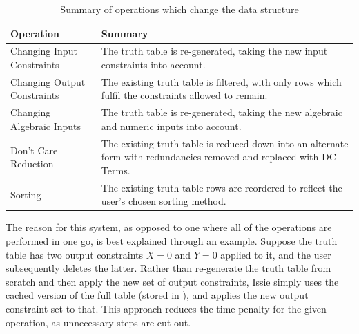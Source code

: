 \begin{table}[!ht]
    \centering
    \begin{tabular}{|p{4cm}|p{9cm}|}
    \hline
        \textbf{Operation} & \textbf{Summary} \\ \hline
        Changing Input Constraints & The truth table is re-generated, taking the new input constraints into account. \\ \hline
        Changing Output Constraints & The existing truth table is filtered, with only rows which fulfil the constraints allowed to remain. \\ \hline
        Changing Algebraic Inputs & The truth table is re-generated, taking the new algebraic and numeric inputs into account. \\ \hline
        Don't Care Reduction & The existing truth table is reduced down into an alternate form with redundancies removed and replaced with DC Terms. \\ \hline
        Sorting & The existing truth table rows are reordered to reflect the user's chosen sorting method. \\ \hline
    \end{tabular}
    \caption{Summary of operations which change the  data structure}
    \label{tab:ttOps}
\end{table}

The reason for this system, as opposed to one where all of the operations are performed in one go, is best explained through an example.
Suppose the truth table has two output constraints $X=0$ and $Y = 0$ applied to it, and the user subsequently deletes the latter. Rather than re-generate the truth table from scratch and then apply the new set of output constraints, Issie simply uses the cached version of the full table (stored in ), and applies the new output constraint set to that. This approach reduces the time-penalty for the given operation, as unnecessary steps are cut out.

